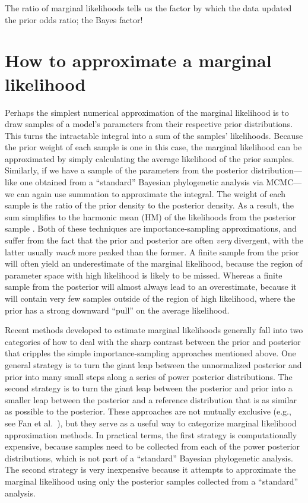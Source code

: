 The ratio of marginal likelihoods tells us the factor by which the data updated
the prior odds ratio; the Bayes factor!


\section{How to approximate a marginal likelihood}

Perhaps the simplest numerical approximation of the marginal likelihood is to
draw samples of a model's parameters from their respective prior distributions.
This turns the intractable integral into a sum of the samples' likelihoods.
Because the prior weight of each sample is one in this case, the marginal
likelihood can be approximated by simply calculating the average likelihood of
the prior samples.
Similarly, if we have a sample of the parameters from the posterior
distribution---like one obtained from a ``standard'' Bayesian phylogenetic
analysis via MCMC---we can again use summation to approximate the integral.
The weight of each sample is the ratio of the prior density to the posterior
density.
As a result, the sum simplifies to the harmonic mean (HM) of the likelihoods
from the posterior sample \citep{Newton1994}.
Both of these techniques are importance-sampling approximations, and suffer
from the fact that the prior and posterior are often \emph{very} divergent,
with the latter usually \emph{much} more peaked than the former.
A finite sample from the prior will often yield an underestimate of the
marginal likelihood, because the region of parameter space with high likelihood
is likely to be missed.
Whereas a finite sample from the posterior will almost always lead to an
overestimate, because it will contain very few samples outside of the region of
high likelihood, where the prior has a strong downward ``pull'' on the average
likelihood.

Recent methods developed to estimate marginal likelihoods generally fall into
two categories of how to deal with the sharp contrast between the prior
and posterior that cripples the simple importance-sampling approaches
mentioned above.
One general strategy is to turn the giant leap between the unnormalized
posterior and prior into many small steps along a series of power posterior
distributions.
The second strategy is to turn the giant leap between the posterior and prior
into a smaller leap between the posterior and a reference distribution that is
as similar as possible to the posterior.
These approaches are not mutually exclusive (e.g., see Fan et al.\
\citeyear{Fan2011}), but they serve as a useful way to categorize marginal
likelihood approximation methods.
In practical terms, the first strategy is computationally expensive, because
samples need to be collected from each of the power posterior distributions,
which is not part of a ``standard'' Bayesian phylogenetic analysis.
The second strategy is very inexpensive because it attempts to approximate the
marginal likelihood using only the posterior samples collected from a
``standard'' analysis.

